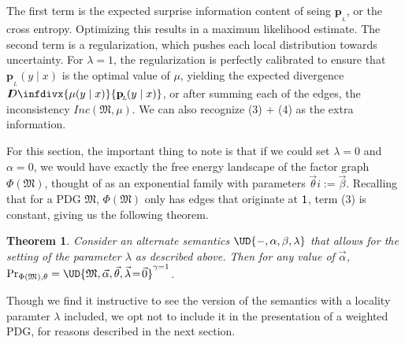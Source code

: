 \documentclass{article}
\theoremstyle{plain}
\newtheorem{theorem}{Theorem}[section]
\theoremstyle{definition}
\theoremstyle{remark}
\newcommand{\thickD}{I\mkern-8muD}
\newcommand{\kldiv}{\thickD\infdivx}%
\newcommand\mat[1]{\mathbf{#1}}
\newcommand{\bp}[1][L]{\mat{p}_{\!_{#1}\!}}
\newcommand{\dg}[1]{\mathfrak{#1}}
\newcommand\Inc{\mathit{Inc}}
\numberwithin{equation}{section}
\begin{document}
	The first term is the expected surprise information content of seing $\bp$, or the cross entropy. Optimizing this results in a maximum likelihood estimate. The second term is a regularization, which pushes each local distribution towards uncertainty. For $\lambda = 1$, the regularization is perfectly calibrated to ensure that $\bp(y \mid x)$ is the optimal value of $\mu$, yielding the expected divergence $\kldiv{\mu(y\mid x)}{\bp(y\mid x)}$, or after summing each of the edges, the inconsistency $\Inc(\dg M, \mu)$. We can also recognize (3) + (4) as the extra information.
	
	For this section, the important thing to note is that if we could set $\lambda = 0$ and $\alpha = 0$, we would have exactly the free energy landscape of the factor graph $\Phi(\dg M)$, thought of as an exponential family with parameters $\vec \theta i:= \vec \beta$. Recalling that for a PDG $\dg M$, $\Phi(\dg M)$ only has edges that originate at $\sf 1$, term (3) is constant, giving us the following theorem.
	
	\begin{theorem}
		Consider an alternate semantics $\UD{-, \alpha, \beta, \lambda}$ that allows for the setting of the parameter $\lambda$ as described above. Then for any value of $\vec\alpha$, $\Pr_{\Phi(\dg M),\theta} = \UD{\dg M, \vec{\alpha}, \vec{\theta}, \vec\lambda \!=\! \vec 0 }^{\gamma=1}$.
	\end{theorem}

	Though we find it instructive to see the version of the semantics with a locality paramter $\lambda$ included, we opt not to include it in the presentation of a weighted PDG, for reasons described in the next section.
	
\end{document}

